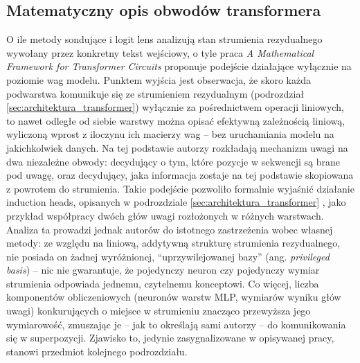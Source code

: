 \subsection{Matematyczny opis obwodów transformera}
\label{sec:framework_obwodow}
O ile metody sondujące i logit lens analizują stan strumienia rezydualnego wywołany przez konkretny tekst wejściowy, o tyle praca \textit{A Mathematical Framework for Transformer Circuits} \cite{elhage_2021_mathematical_framework_transformer_circuits} proponuje podejście działające wyłącznie na poziomie wag modelu. Punktem wyjścia jest obserwacja, że skoro każda podwarstwa komunikuje się ze strumieniem rezydualnym (podrozdział \ref{sec:architektura_transformer}) wyłącznie za pośrednictwem operacji liniowych, to nawet odległe od siebie warstwy można opisać efektywną zależnością liniową, wyliczoną wprost z iloczynu ich macierzy wag -- bez uruchamiania modelu na jakichkolwiek danych. Na tej podstawie autorzy rozkładają mechanizm uwagi na dwa niezależne obwody: decydujący o tym, które pozycje w sekwencji są brane pod uwagę, oraz decydujący, jaka informacja zostaje na tej podstawie skopiowana z powrotem do strumienia. Takie podejście pozwoliło formalnie wyjaśnić działanie induction heads, opisanych w podrozdziale \ref{sec:architektura_transformer} \cite{olsson_2022_induction_heads}, jako przykład współpracy dwóch głów uwagi rozłożonych w różnych warstwach. \newline
Analiza ta prowadzi jednak autorów do istotnego zastrzeżenia wobec własnej metody: ze względu na liniową, addytywną strukturę strumienia rezydualnego, nie posiada on żadnej wyróżnionej, \enquote{uprzywilejowanej bazy} (ang. \textit{privileged basis}) -- nic nie gwarantuje, że pojedynczy neuron czy pojedynczy wymiar strumienia odpowiada jednemu, czytelnemu konceptowi. Co więcej, liczba komponentów obliczeniowych (neuronów warstw MLP, wymiarów wyniku głów uwagi) konkurujących o miejsce w strumieniu znacząco przewyższa jego wymiarowość, zmuszając je -- jak to określają sami autorzy -- do komunikowania się w superpozycji. Zjawisko to, jedynie zasygnalizowane w opisywanej pracy, stanowi przedmiot kolejnego podrozdziału.

